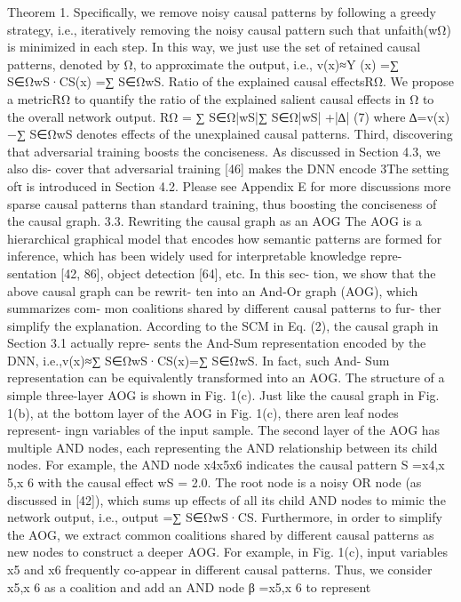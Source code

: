 Theorem 1. Speciﬁcally, we remove noisy causal patterns
by following a greedy strategy, i.e., iteratively removing
the noisy causal pattern such that unfaith(wΩ) is minimized
in each step. In this way, we just use the set of retained
causal patterns, denoted by Ω, to approximate the output, i.e.,
v(x)≈Y (x) =∑
S∈ΩwS·CS(x) =∑
S∈ΩwS.
Ratio of the explained causal effectsRΩ. We propose a
metricRΩ to quantify the ratio of the explained salient causal
effects in Ω to the overall network output.
RΩ =
∑
S∈Ω|wS|∑
S∈Ω|wS| +|∆| (7)
where ∆=v(x)−∑
S∈ΩwS denotes effects of the unexplained
causal patterns.
Third, discovering that adversarial training boosts
the conciseness. As discussed in Section 4.3, we also dis-
cover that adversarial training [46] makes the DNN encode
3The setting ofτ is introduced in Section 4.2. Please see Appendix E
for more discussions
more sparse causal patterns than standard training, thus
boosting the conciseness of the causal graph.
3.3. Rewriting the causal graph as an AOG
The AOG is a hierarchical graphical model that encodes
how semantic patterns are formed for inference, which
has been widely used for interpretable knowledge repre-
sentation [42, 86], object detection [64], etc. In this sec-
tion, we show that the above causal graph can be rewrit-
ten into an And-Or graph (AOG), which summarizes com-
mon coalitions shared by different causal patterns to fur-
ther simplify the explanation. According to the SCM in
Eq. (2), the causal graph in Section 3.1 actually repre-
sents the And-Sum representation encoded by the DNN,
i.e.,v(x)≈∑
S∈ΩwS·CS(x)=∑
S∈ΩwS. In fact, such And-
Sum representation can be equivalently transformed into an
AOG.
The structure of a simple three-layer AOG is shown in
Fig. 1(c). Just like the causal graph in Fig. 1(b), at the bottom
layer of the AOG in Fig. 1(c), there aren leaf nodes represent-
ingn variables of the input sample. The second layer of the
AOG has multiple AND nodes, each representing the AND
relationship between its child nodes. For example, the AND
node x4x5x6 indicates the causal pattern S ={x4,x 5,x 6}
with the causal effect wS = 2.0. The root node is a noisy
OR node (as discussed in [42]), which sums up effects of
all its child AND nodes to mimic the network output, i.e.,
output =∑
S∈ΩwS·CS.
Furthermore, in order to simplify the AOG, we extract
common coalitions shared by different causal patterns as
new nodes to construct a deeper AOG. For example, in
Fig. 1(c), input variables x5 and x6 frequently co-appear
in different causal patterns. Thus, we consider x5,x 6 as a
coalition and add an AND node β ={x5,x 6} to represent
